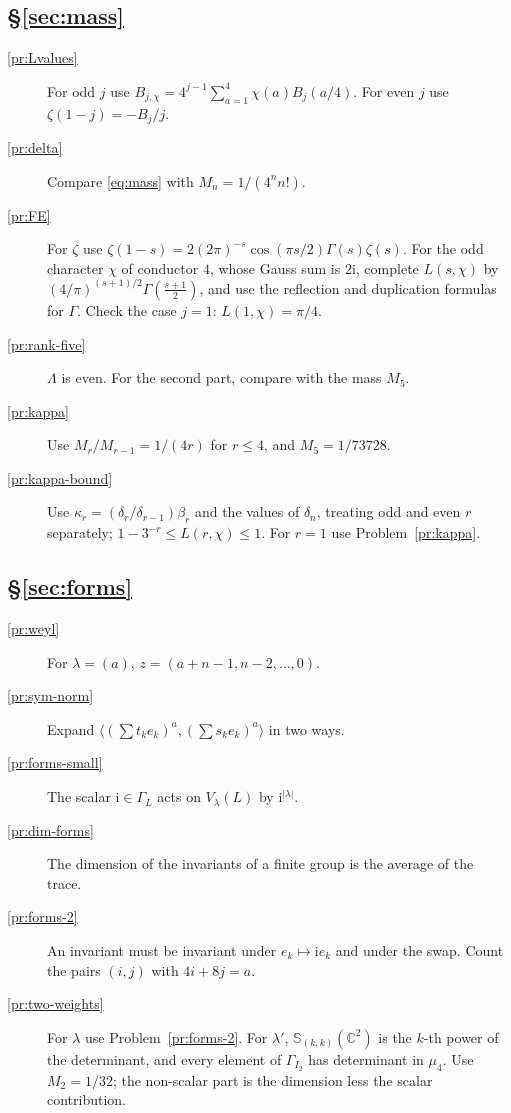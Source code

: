 \documentclass[reqno]{amsart}
\theoremstyle{definition}
\theoremstyle{plain}
\newcommand{\C}{\mathbb{C}}
\newcommand{\ii}{\mathrm{i}}
\newcommand{\Sc}{\mathbb{S}}
\begin{document}
\subsection*{\S\ref{sec:mass}}
\begin{description}
\item[\ref{pr:Lvalues}] For odd \(j\) use \(B_{j,\chi} = 4^{j-1}\sum_{a=1}^{4} \chi(a) B_j(a/4)\).  For even \(j\) use \(\zeta(1-j) = -B_j/j\).
\item[\ref{pr:delta}] Compare \eqref{eq:mass} with \(M_n = 1/(4^n n!)\).
\item[\ref{pr:FE}] For \(\zeta\) use \(\zeta(1-s) = 2(2\pi)^{-s}\cos(\pi s/2)\Gamma(s)\zeta(s)\).  For the odd character \(\chi\) of conductor \(4\), whose Gauss sum is \(2\ii\), complete \(L(s,\chi)\) by \((4/\pi)^{(s+1)/2}\Gamma(\tfrac{s+1}{2})\), and use the reflection and duplication formulas for \(\Gamma\).  Check the case \(j = 1\): \(L(1, \chi) = \pi/4\).
\item[\ref{pr:rank-five}] \(\Lambda\) is even.  For the second part, compare with the mass \(M_5\).
\item[\ref{pr:kappa}] Use \(M_r/M_{r-1} = 1/(4r)\) for \(r \le 4\), and \(M_5 = 1/73728\).
\item[\ref{pr:kappa-bound}] Use \(\kappa_r = (\delta_r/\delta_{r-1})\beta_r\) and the values of \(\delta_n\), treating odd and even \(r\) separately; \(1 - 3^{-r} \le L(r,\chi) \le 1\).  For \(r = 1\) use Problem~\ref{pr:kappa}.
\end{description}

\subsection*{\S\ref{sec:forms}}
\begin{description}
\item[\ref{pr:weyl}] For \(\lambda = (a)\), \(z = (a + n - 1, n - 2, \dots, 0)\).
\item[\ref{pr:sym-norm}] Expand \(\langle (\sum t_k e_k)^a, (\sum s_k e_k)^a \rangle\) in two ways.
\item[\ref{pr:forms-small}] The scalar \(\ii \in \Gamma_L\) acts on \(V_\lambda(L)\) by \(\ii^{\lvert\lambda\rvert}\).
\item[\ref{pr:dim-forms}] The dimension of the invariants of a finite group is the average of the trace.
\item[\ref{pr:forms-2}] An invariant must be invariant under \(e_k \mapsto \ii e_k\) and under the swap.  Count the pairs \((i,j)\) with \(4i + 8j = a\).
\item[\ref{pr:two-weights}] For \(\lambda\) use Problem~\ref{pr:forms-2}.  For \(\lambda'\), \(\Sc_{(k,k)}(\C^2)\) is the \(k\)-th power of the determinant, and every element of \(\Gamma_{I_2}\) has determinant in \(\mu_4\).  Use \(M_2 = 1/32\); the non-scalar part is the dimension less the scalar contribution.
\end{description}
\end{document}
